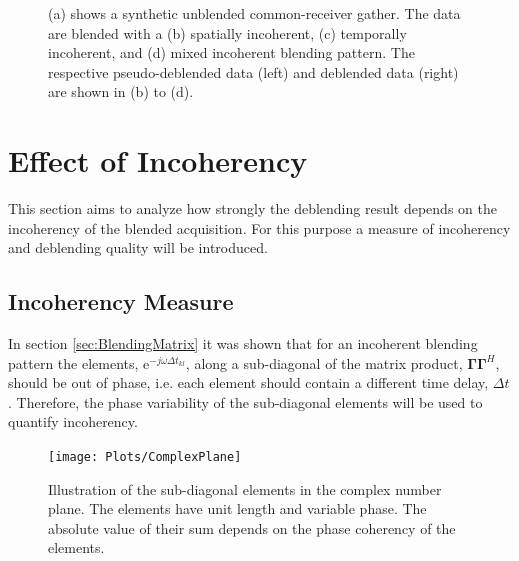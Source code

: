 \begin{figure}
	\caption{(a) shows a synthetic unblended common-receiver gather. The data are blended with a (b) spatially incoherent, (c) temporally incoherent, and (d) mixed incoherent blending pattern. The respective pseudo-deblended data (left) and deblended data (right) are shown in (b) to (d).}
	\label{fig:Ch-Results-Debl-x-inline}

\end{figure}


\FloatBarrier
\section{Effect of Incoherency} \label{sec:Effect-of-Incoherency}

This section aims to analyze how strongly the deblending result depends on the incoherency of the blended acquisition. For this purpose a measure of incoherency and deblending quality will be introduced.

\subsection*{Incoherency Measure}



In section \ref{sec:BlendingMatrix} it was shown that for an incoherent blending pattern the elements, $\mathrm{e}^{-j \omega \Delta t_{kl}}$, along a sub-diagonal of the matrix product, $\mathbf{\Gamma \Gamma}^H$, should be out of phase, i.e. each element should contain a different time delay, $\Delta t$. Therefore, the phase variability of the sub-diagonal elements will be used to quantify incoherency. 

\begin{figure}
	\centering
	\texttt{[image: Plots/ComplexPlane]}
	\caption{Illustration of the sub-diagonal elements in the complex number plane. The elements have unit length and variable phase. The absolute value of their sum depends on the phase coherency of the elements.}
	\label{fig:Ch-Results-complex-circle}
\end{figure}

